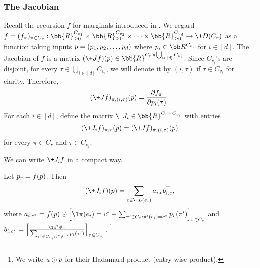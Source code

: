 \documentclass[a4paper,11pt]{article}
\begin{document}
\subsubsection{The Jacobian}
Recall the recursion $f$ for marginals introduced in . We regard $f=(f_\pi)_{\pi \in C_r}: \bb{R}_{\geq 0}^{C_{v_1}}\times \bb{R}_{\geq 0}^{C_{v_2}}\times \cdots \times \bb{R}_{\geq 0}^{C_{v_d}} \rightarrow \+D(C_{r})$
as a function taking inputs $\*p = (\*p_1, \*p_2, \dots, \*p_d)$ where $\*p_i\in \bb R^{C_{v_i}}$ for $i\in [d]$. The Jacobian of $f$ is a matrix $(\+J f)(\*p) \in \bb{R}^{C_r\times \bigcup_{i\in [d]} C_{v_i}}$. Since $C_{v_i}$'s are disjoint, for every $\tau \in \bigcup_{i\in [d]} C_{v_i}$, we will denote it by $(i,\tau)$ if $\tau\in C_{v_i}$ for clarity. Therefore, 
\begin{equation*}
    (\+J f)_{\pi,(i,\tau)}(\*p)= \frac{\partial f_\pi}{\partial \*p_{i}(\tau)}.
\end{equation*}
For each $i\in [d]$, define the matrix $\+J_i \in \bb{R}^{C_r\times C_{v_i}}$ with entries
\begin{equation*}
    (\+J_i f)_{\pi,\tau}(\*p) = (\+J f)_{\pi,(i,\tau)}(\*p)
\end{equation*}
for every $\pi\in C_r$ and $\tau\in C_{v_i}$. 

\bigskip
We can write $\+J_if$ in a compact way. 
\begin{proposition} 
Let $\*p_r = f(\*p)$. Then
\begin{align*}
    (\+J_i f)(\*p)=\sum_{c\in \+L(e_i)}\*a_{i,c} \*b_{i,c}^{\top},
\end{align*}
where $\*a_{i,c^*}=f(\*p) \odot \Big[\1{\pi(e_i)=c^*}-\sum_{\pi' \in C_{r}: \pi'(e_i)=c^*}\*p_r(\pi')\Big]_{\pi\in C_r}$
and $\*b_{i,c^*}=\Big[\frac{\1{c^*\notin \tau}}{\sum_{\tau' \in C_{v_i}: c^*\notin \tau'}\*p_i(\tau')} \Big]_{\tau\in C_{v_i}}$. \footnote{We write $\*u \odot \*v$ for their Hadamard product (entry-wise product).}
\end{proposition}
\end{document}
